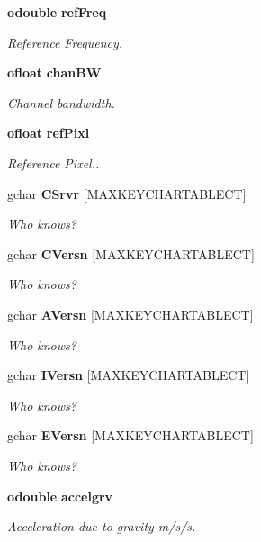 \begin{CompactItemize}
{\bf odouble} {\bf ref\-Freq}
\begin{CompactList}\small\item\em Reference Frequency. \item\end{CompactList}\item 
{\bf ofloat} {\bf chan\-BW}
\begin{CompactList}\small\item\em Channel bandwidth. \item\end{CompactList}\item 
{\bf ofloat} {\bf ref\-Pixl}
\begin{CompactList}\small\item\em Reference Pixel.. \item\end{CompactList}\item 
gchar {\bf CSrvr} [MAXKEYCHARTABLECT]
\begin{CompactList}\small\item\em Who knows? \item\end{CompactList}\item 
gchar {\bf CVersn} [MAXKEYCHARTABLECT]
\begin{CompactList}\small\item\em Who knows? \item\end{CompactList}\item 
gchar {\bf AVersn} [MAXKEYCHARTABLECT]
\begin{CompactList}\small\item\em Who knows? \item\end{CompactList}\item 
gchar {\bf IVersn} [MAXKEYCHARTABLECT]
\begin{CompactList}\small\item\em Who knows? \item\end{CompactList}\item 
gchar {\bf EVersn} [MAXKEYCHARTABLECT]
\begin{CompactList}\small\item\em Who knows? \item\end{CompactList}\item 
{\bf odouble} {\bf accelgrv}
\begin{CompactList}\small\item\em Acceleration due to gravity m/s/s. \item\end{CompactList}\item 

\end{CompactItemize}
